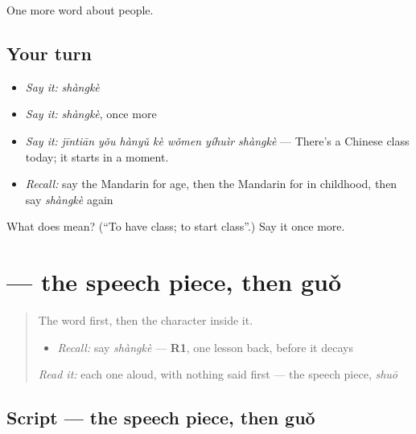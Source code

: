 \begin{grammarlens}[title={What you've built}]
One more word about people.
\end{grammarlens}

\subsection*{Your turn}
\begin{itemize}
\raggedright
  \item \emph{Say it:} \emph{shàngkè}
  \item \emph{Say it:} \emph{shàngkè}, once more
  \item \emph{Say it:} \emph{jīntiān yǒu hànyǔ kè wǒmen yíhuìr shàngkè} — There's a Chinese class today; it starts in a moment.
  \item \emph{Recall:} say the Mandarin for age, then the Mandarin for in childhood, then say \emph{shàngkè} again
\end{itemize}

\begin{tcolorbox}[breakable,colback=teal!4,colframe=teal!35!black,title={Before you move on}]
What does  mean? (\textquotedblleft{}To have class; to start class\textquotedblright{}.) Say it once more.
\end{tcolorbox}
\section[\texorpdfstring{\zh{课} (kè)}{课 (kè)}]{ — the speech piece, then guǒ}

\label{lesson:ZH-W79-ke-lesson}



\begin{quote}
The word first, then the character inside it.

\begin{itemize}
\raggedright
  \item \emph{Recall:} say \emph{shàngkè} — \textbf{R1}, one lesson back, before it decays
\end{itemize}

\begin{quote}
 
\end{quote}

\emph{Read it:} each one aloud, with nothing said first — the speech piece, \emph{shuō}
\end{quote}

\subsection*{Script — the speech piece, then guǒ}

